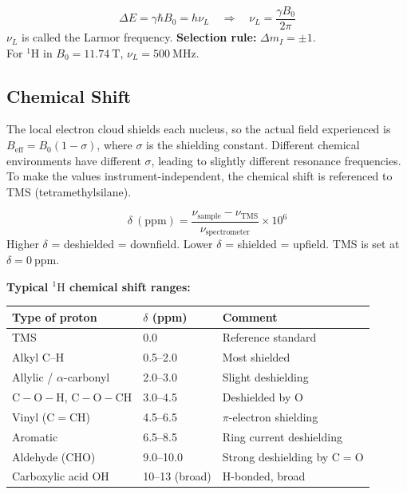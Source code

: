 \documentclass[12pt,a4paper]{article}
\begin{document}
\begin{tcolorbox}[formulabox, title={Larmor (Resonance) Condition}]
\[
\Delta E = \gamma\hbar B_0 = h\nu_L \quad\Rightarrow\quad \nu_L=\frac{\gamma B_0}{2\pi}
\]
$\nu_L$ is called the Larmor frequency. \textbf{Selection rule:} $\Delta m_I=\pm 1$.\\
For $^{1}\mathrm{H}$ in $B_0=11.74\ \mathrm{T}$, $\nu_L=500\ \mathrm{MHz}$.
\end{tcolorbox}

\subsection{Chemical Shift}
The local electron cloud shields each nucleus, so the actual field experienced is $B_{\mathrm{eff}}=B_0(1-\sigma)$, where $\sigma$ is the shielding constant. Different chemical environments have different $\sigma$, leading to slightly different resonance frequencies. To make the values instrument-independent, the chemical shift is referenced to TMS (tetramethylsilane).

\begin{tcolorbox}[formulabox, title={Chemical Shift}]
\[
\delta\ (\mathrm{ppm}) = \frac{\nu_{\mathrm{sample}}-\nu_{\mathrm{TMS}}}{\nu_{\mathrm{spectrometer}}}\times 10^{6}
\]
Higher $\delta$ = deshielded = downfield. Lower $\delta$ = shielded = upfield. TMS is set at $\delta=0\ \mathrm{ppm}$.
\end{tcolorbox}

\textbf{Typical $^{1}\mathrm{H}$ chemical shift ranges:}\par\noindent
\begin{tabularx}{\linewidth}{|B{3.4cm}|Y|Y|}
\hline
\textbf{Type of proton} & \textbf{$\delta$ (ppm)} & \textbf{Comment} \\
\hline
TMS & 0.0 & Reference standard \\
\hline
Alkyl C--H & 0.5--2.0 & Most shielded \\
\hline
Allylic / $\alpha$-carbonyl & 2.0--3.0 & Slight deshielding \\
\hline
$\mathrm{C{-}O{-}H}$, $\mathrm{C{-}O{-}CH}$ & 3.0--4.5 & Deshielded by O \\
\hline
Vinyl ($\mathrm{C{=}CH}$) & 4.5--6.5 & $\pi$-electron shielding \\
\hline
Aromatic & 6.5--8.5 & Ring current deshielding \\
\hline
Aldehyde ($\mathrm{CHO}$) & 9.0--10.0 & Strong deshielding by C${=}$O \\
\hline
Carboxylic acid OH & 10--13 (broad) & H-bonded, broad \\
\hline
\end{tabularx}
\end{document}
